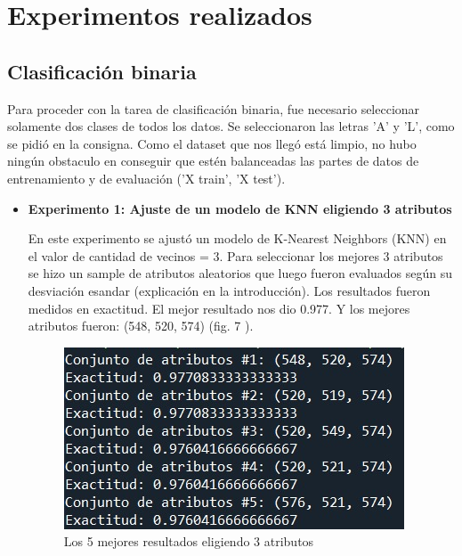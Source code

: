 \documentclass[11pt,a4paper, twocolumn]{article}
\begin{document}
\section{Experimentos realizados}
\subsection{Clasificación binaria}
Para proceder con la tarea de clasificación binaria, fue necesario seleccionar solamente dos clases de todos los datos. Se seleccionaron las letras 'A' y 'L', como se pidió en la consigna.
Como el dataset que nos llegó está limpio, no hubo ningún obstaculo en conseguir que estén balanceadas las partes de datos de entrenamiento y de evaluación ('X train', 'X test'). 
\begin{itemize}
    \item[]
       \textbf{Experimento 1: Ajuste de un modelo de KNN eligiendo 3 atributos}

En este experimento se ajustó un modelo de K-Nearest Neighbors (KNN) en el valor de cantidad de vecinos = 3. 
Para seleccionar los mejores 3 atributos se hizo un sample de atributos aleatorios que luego fueron evaluados según su desviación esandar (explicación en la introducción). 
Los resultados fueron medidos en exactitud. El mejor resultado nos dio 0.977. Y los mejores atributos fueron: (548, 520, 574) (fig. 7 ).

\begin{figure}[H]
	\centering
	\includegraphics[scale=0.6]{figuras/2a_1.jpg}
	\caption{Los 5 mejores resultados eligiendo 3  atributos}
	\label{fig:7}
\end{figure}
\end{itemize}
\end{document}
